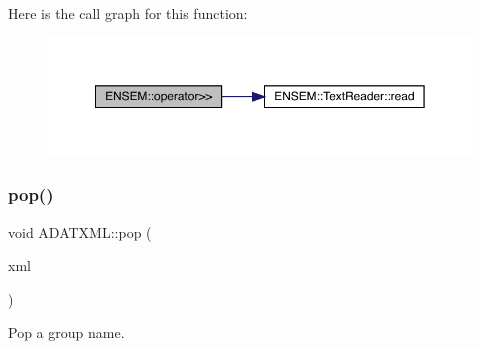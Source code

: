 Here is the call graph for this function\+:\nopagebreak
\begin{figure}[H]
\begin{center}
\leavevmode
\includegraphics[width=350pt]{d2/da3/group__io_ga807a1dae246fb10630e4e967d01b2e85_cgraph}
\end{center}
\end{figure}
\mbox{\label{group__io_gac235f191b977af85918b9a9d063ba5f4}} 
\subsubsection{\texorpdfstring{pop()}{pop()}\hspace{0.1cm}{\footnotesize\ttfamily [1/2]}}
{\footnotesize\ttfamily void A\+D\+A\+T\+X\+M\+L\+::pop (\begin{DoxyParamCaption}\item[{\mbox{\hyperlink{classADATXML_1_1XMLWriter}{X\+M\+L\+Writer}} \&}]{xml }\end{DoxyParamCaption})}



Pop a group name. 

